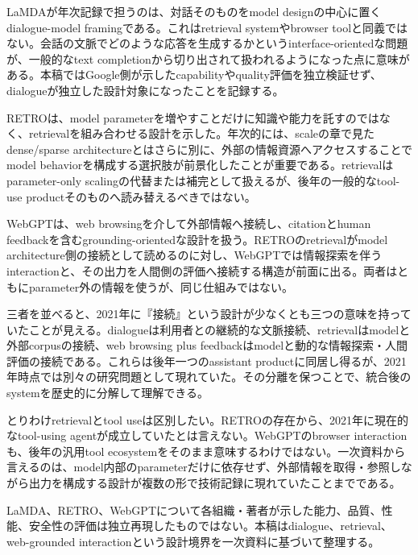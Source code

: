 
LaMDAが年次記録で担うのは、対話そのものをmodel designの中心に置くdialogue-model framingである。これはretrieval systemやbrowser toolと同義ではない。会話の文脈でどのような応答を生成するかというinterface-orientedな問題が、一般的なtext completionから切り出されて扱われるようになった点に意味がある。本稿ではGoogle側が示したcapabilityやquality評価を独立検証せず、dialogueが独立した設計対象になったことを記録する。\autocite{src-a3971b3f646f}


RETROは、model parameterを増やすことだけに知識や能力を託すのではなく、retrievalを組み合わせる設計を示した。年次的には、scaleの章で見たdense/sparse architectureとはさらに別に、外部の情報資源へアクセスすることでmodel behaviorを構成する選択肢が前景化したことが重要である。retrievalはparameter-only scalingの代替または補完として扱えるが、後年の一般的なtool-use productそのものへ読み替えるべきではない。\autocite{src-66643bb115ae,src-6ab2302937b2}


WebGPTは、web browsingを介して外部情報へ接続し、citationとhuman feedbackを含むgrounding-orientedな設計を扱う。RETROのretrievalがmodel architecture側の接続として読めるのに対し、WebGPTでは情報探索を伴うinteractionと、その出力を人間側の評価へ接続する構造が前面に出る。両者はともにparameter外の情報を使うが、同じ仕組みではない。\autocite{src-72eada5e8850,src-bb1464aabad9}


三者を並べると、2021年に『接続』という設計が少なくとも三つの意味を持っていたことが見える。dialogueは利用者との継続的な文脈接続、retrievalはmodelと外部corpusの接続、web browsing plus feedbackはmodelと動的な情報探索・人間評価の接続である。これらは後年一つのassistant productに同居し得るが、2021年時点では別々の研究問題として現れていた。その分離を保つことで、統合後のsystemを歴史的に分解して理解できる。\autocite{src-66643bb115ae,src-6ab2302937b2,src-72eada5e8850,src-a3971b3f646f,src-bb1464aabad9}


とりわけretrievalとtool useは区別したい。RETROの存在から、2021年に現在的なtool-using agentが成立していたとは言えない。WebGPTのbrowser interactionも、後年の汎用tool ecosystemをそのまま意味するわけではない。一次資料から言えるのは、model内部のparameterだけに依存せず、外部情報を取得・参照しながら出力を構成する設計が複数の形で技術記録に現れていたことまでである。\autocite{src-66643bb115ae,src-6ab2302937b2,src-72eada5e8850,src-bb1464aabad9}


\begin{claimboundary}
LaMDA、RETRO、WebGPTについて各組織・著者が示した能力、品質、性能、安全性の評価は独立再現したものではない。本稿はdialogue、retrieval、web-grounded interactionという設計境界を一次資料に基づいて整理する。\autocite{src-66643bb115ae,src-6ab2302937b2,src-72eada5e8850,src-a3971b3f646f,src-bb1464aabad9}
\end{claimboundary}
